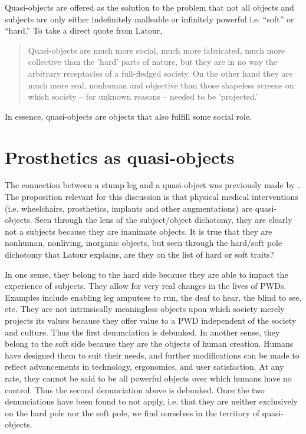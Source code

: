 \documentclass[a4paper]{article}
\begin{document}
\begin{appendices}
Quasi-objects are offered as the solution to the problem that not all objects
and subjects are only either indefinitely malleable or infinitely powerful
i.e. ``soft'' or ``hard.'' To take a direct quote from Latour,
%
\begin{quote}
Quasi-objects are much more social, much more fabricated, much more
collective than the 'hard' parts of nature, but they are in no way the
arbitrary receptacles of a full-fledged society. On the other hand they are
much more real, nonhuman and objective than those shapeless screens on which
society – for unknown reasons – needed to be 'projected.' \citep{latour2012we}
\end{quote}
%
In essence, quasi-objects are objects that also fulfill some social role.


\newpage
\section{Prosthetics as quasi-objects}
\label{pros-quasi}

The connection between a stump leg and a quasi-object was previously made by
\cite{bertram2018bestial}. The proposition relevant for this discussion is
that physical medical interventions (i.e. wheelchairs, prosthetics, implants
and other augmentations) are quasi-objects. Seen through the lens of the
subject/object dichotomy, they are clearly not a subjects because they are
inanimate objects. It is true that they are nonhuman, nonliving, inorganic
objects, but seen through the hard/soft pole dichotomy that Latour explains,
are they on the list of hard or soft traits?

In one sense, they belong to the hard side because they are able to impact the
experience of subjects. They allow for very real changes in the lives of PWDs.
Examples include enabling leg amputees to run, the deaf to hear, the blind to
see, etc. They are not intrinsically meaningless objects upon which society
merely projects its values because they offer value to a PWD independent of
the society and culture. Thus the first denunciation is debunked. In another
sense, they belong to the soft side because they are the objects of human
creation. Humans have designed them to suit their needs, and further
modifications can be made to reflect advancements in technology, ergonomics,
and user satisfaction. At any rate, they cannot be said to be all powerful
objects over which humans have no control. Thus the second denunciation above
is debunked. Once the two denunciations have been found to not apply, i.e.
that they are neither exclusively on the hard pole nor the soft pole, we find
ourselves in the territory of quasi-objects.

\end{appendices}
\end{document}
